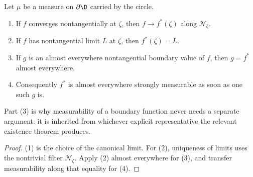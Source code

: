 \begin{lemma}
  \label{lem:boundary_value_bridge}
  \leanok
  Let $\mu$ be a measure on $\partial\D$ carried by the circle.
  \begin{enumerate}
    \item If $f$ converges nontangentially at $\zeta$, then $f\to f^*(\zeta)$
      along $\mathcal{N}_\zeta$.
    \item If $f$ has nontangential limit $L$ at $\zeta$, then $f^*(\zeta)=L$.
    \item If $g$ is an almost everywhere nontangential boundary value of $f$,
      then $g=f^*$ almost everywhere.
    \item Consequently $f^*$ is almost everywhere strongly measurable as soon as
      one such $g$ is.
  \end{enumerate}
  Part (3) is why measurability of a boundary function never needs a separate
  argument: it is inherited from whichever explicit representative the relevant
  existence theorem produces.
  \begin{proof}
    \leanok
    (1) is the choice of the canonical limit. For (2), uniqueness of limits
    uses the nontrivial filter $\mathcal{N}_\zeta$. Apply (2) almost
    everywhere for (3), and transfer measurability along that equality for (4).
  \end{proof}
\end{lemma}

